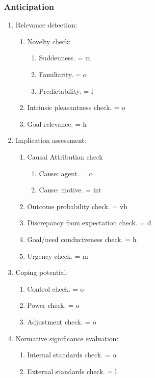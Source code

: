 {{\subsubsection{Anticipation}

\begin{enumerate}
\item  Relevance detection:
\begin{enumerate}
\item  Novelty check:
\begin{enumerate}
\item  Suddenness. = m
\item  Familiarity. = o
\item  Predictability. = l
\end{enumerate}
\item  Intrinsic pleasantness check. = o
\item  Goal relevance. = h
\end{enumerate}
\item  Implication assessment:
\begin{enumerate}
\item  Causal Attribution check
\begin{enumerate}
\item  Cause: agent. = o
\item  Cause: motive. = int
\end{enumerate}
\item  Outcome probability check. = vh
\item  Discrepancy from expectation check. = d
\item  Goal/need conduciveness check. = h
\item  Urgency check. = m
\end{enumerate}
\item  Coping potential:
\begin{enumerate}
\item  Control check. = o
\item  Power check. = o
\item  Adjustment check. = o
\end{enumerate}
\item  Normative significance evaluation:
\begin{enumerate}
\item  Internal standards check. = o
\item  External standards check. = l
\end{enumerate}
\end{enumerate}

}}
